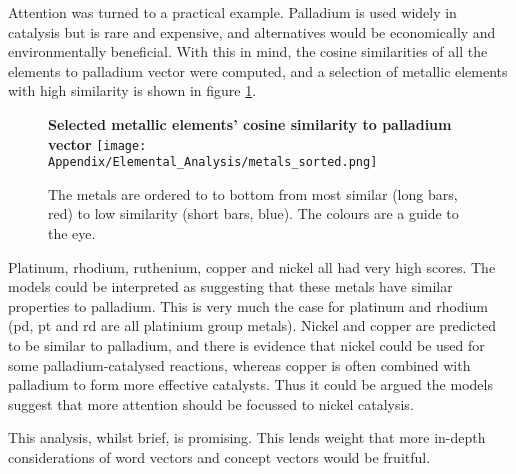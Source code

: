 Attention was turned to a practical example. Palladium is used widely in catalysis but is rare and expensive, and alternatives would be economically and environmentally beneficial\cite{palladium}. With this in mind, the cosine similarities of all the elements to palladium vector were computed, and a selection of metallic elements with high similarity is shown in figure \ref{fig:palladium}. 
\begin{center}
\begin{figure}[H]
  \centering
  \textbf{Selected metallic elements' cosine similarity to palladium vector}
    \texttt{[image: Appendix/Elemental\_Analysis/metals\_sorted.png]}
    \caption[Selected metallic elements' cosine similarity to palladium vector]{The metals are ordered to to bottom from most similar (long bars, red) to low similarity (short bars, blue). The colours are a guide to the eye.}
    \label{fig:palladium}
\end{figure} 
\end{center}
Platinum, rhodium, ruthenium, copper and nickel all had very high scores. The models could be interpreted as suggesting that these metals have similar properties to palladium. This is very much the case for platinum and rhodium (pd, pt and rd are all platinium group metals)\cite{pgm}. Nickel and copper are predicted to be similar to palladium, and there is evidence that nickel could be used for some palladium-catalysed reactions\cite{nickel}, whereas copper is often combined with palladium to form more effective catalysts\cite{copper}. Thus it could be argued the models suggest that more attention should be focussed to nickel catalysis.

This analysis, whilst brief, is promising. This lends weight that more in-depth considerations of word vectors and concept vectors would be fruitful.